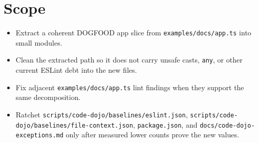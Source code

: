 \section{Scope}\label{record-198-scope}

\begin{itemize}
\tightlist
\item
  Extract a coherent DOGFOOD app slice from \texttt{e\allowbreak{}x\allowbreak{}a\allowbreak{}m\allowbreak{}p\allowbreak{}l\allowbreak{}e\allowbreak{}s\allowbreak{}/\allowbreak{}d\allowbreak{}o\allowbreak{}c\allowbreak{}s\allowbreak{}/\allowbreak{}a\allowbreak{}p\allowbreak{}p\allowbreak{}.\allowbreak{}t\allowbreak{}s} into small modules.
\item
  Clean the extracted path so it does not carry unsafe casts, \texttt{a\allowbreak{}n\allowbreak{}y}, or other current ESLint debt into the new files.
\item
  Fix adjacent \texttt{e\allowbreak{}x\allowbreak{}a\allowbreak{}m\allowbreak{}p\allowbreak{}l\allowbreak{}e\allowbreak{}s\allowbreak{}/\allowbreak{}d\allowbreak{}o\allowbreak{}c\allowbreak{}s\allowbreak{}/\allowbreak{}a\allowbreak{}p\allowbreak{}p\allowbreak{}.\allowbreak{}t\allowbreak{}s} lint findings when they support the same decomposition.
\item
  Ratchet \texttt{s\allowbreak{}c\allowbreak{}r\allowbreak{}i\allowbreak{}p\allowbreak{}t\allowbreak{}s\allowbreak{}/\allowbreak{}c\allowbreak{}o\allowbreak{}d\allowbreak{}e\allowbreak{}-\allowbreak{}d\allowbreak{}o\allowbreak{}j\allowbreak{}o\allowbreak{}/\allowbreak{}b\allowbreak{}a\allowbreak{}s\allowbreak{}e\allowbreak{}l\allowbreak{}i\allowbreak{}n\allowbreak{}e\allowbreak{}s\allowbreak{}/\allowbreak{}e\allowbreak{}s\allowbreak{}l\allowbreak{}i\allowbreak{}n\allowbreak{}t\allowbreak{}.\allowbreak{}j\allowbreak{}s\allowbreak{}o\allowbreak{}n}, \texttt{s\allowbreak{}c\allowbreak{}r\allowbreak{}i\allowbreak{}p\allowbreak{}t\allowbreak{}s\allowbreak{}/\allowbreak{}c\allowbreak{}o\allowbreak{}d\allowbreak{}e\allowbreak{}-\allowbreak{}d\allowbreak{}o\allowbreak{}j\allowbreak{}o\allowbreak{}/\allowbreak{}b\allowbreak{}a\allowbreak{}s\allowbreak{}e\allowbreak{}l\allowbreak{}i\allowbreak{}n\allowbreak{}e\allowbreak{}s\allowbreak{}/\allowbreak{}f\allowbreak{}i\allowbreak{}l\allowbreak{}e\allowbreak{}-\allowbreak{}c\allowbreak{}o\allowbreak{}n\allowbreak{}t\allowbreak{}e\allowbreak{}x\allowbreak{}t\allowbreak{}.\allowbreak{}j\allowbreak{}s\allowbreak{}o\allowbreak{}n}, \texttt{p\allowbreak{}a\allowbreak{}c\allowbreak{}k\allowbreak{}a\allowbreak{}g\allowbreak{}e\allowbreak{}.\allowbreak{}j\allowbreak{}s\allowbreak{}o\allowbreak{}n}, and \texttt{d\allowbreak{}o\allowbreak{}c\allowbreak{}s\allowbreak{}/\allowbreak{}c\allowbreak{}o\allowbreak{}d\allowbreak{}e\allowbreak{}-\allowbreak{}d\allowbreak{}o\allowbreak{}j\allowbreak{}o\allowbreak{}-\allowbreak{}e\allowbreak{}x\allowbreak{}c\allowbreak{}e\allowbreak{}p\allowbreak{}t\allowbreak{}i\allowbreak{}o\allowbreak{}n\allowbreak{}s\allowbreak{}.\allowbreak{}m\allowbreak{}d} only after measured lower counts prove the new values.

\end{itemize}
